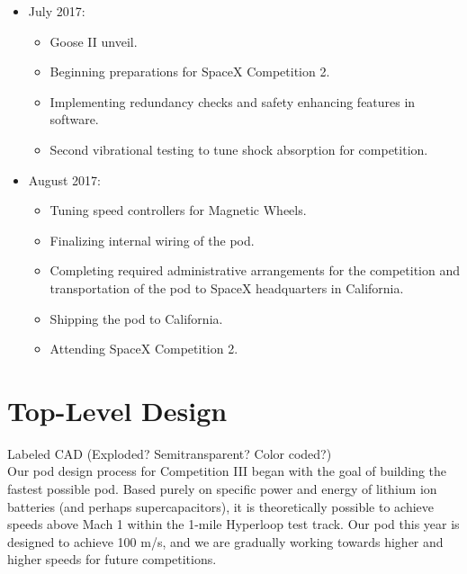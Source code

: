 \documentclass[main.tex]{subfiles}
\begin{document}
\begin{flushleft}
\begin{itemize}
\item July 2017:
\begin{itemize}
    \item Goose II unveil.
    \item Beginning preparations for SpaceX Competition 2.
    \item Implementing redundancy checks and safety enhancing features in software.
    \item Second vibrational testing to tune shock absorption for competition.
\end{itemize}

\item August 2017:
\begin{itemize}
    \item Tuning speed controllers for Magnetic Wheels.
    \item Finalizing internal wiring of the pod.
    \item Completing required administrative arrangements for the competition and transportation of the pod to SpaceX headquarters in California.
    \item Shipping the pod to California.
    \item Attending SpaceX Competition 2.
\end{itemize}

\end{itemize}

\chapter{Top-Level Design}
\label{ch:top-level-design}
Labeled CAD (Exploded? Semitransparent? Color coded?)\\

Our pod design process for Competition III began with the goal of building the fastest possible pod. Based purely on specific power and energy of lithium ion batteries (and perhaps supercapacitors), it is theoretically possible to achieve speeds above Mach 1 within the 1-mile Hyperloop test track. Our pod this year is designed to achieve 100 m/s, and we are gradually working towards higher and higher speeds for future competitions.



\end{flushleft}
\end{document}
